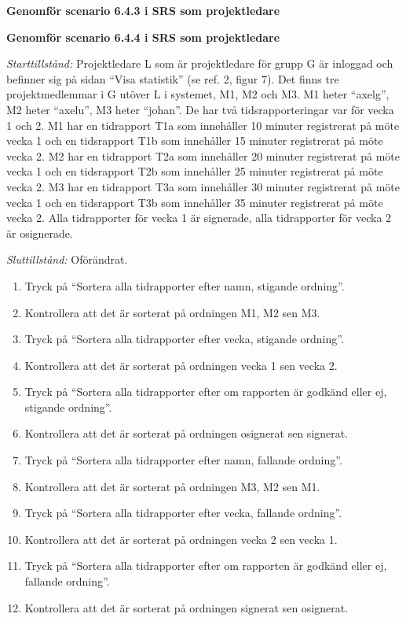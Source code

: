 \documentclass[a4paper]{article}
\begin{document}
\begin{ST}
\begin{enumerate}
\end{enumerate}

\item
\textbf{Genomför scenario 6.4.3 i SRS som projektledare}

\item
\textbf{Genomför scenario 6.4.4 i SRS som projektledare}

\emph{Starttillstånd:} Projektledare L som är projektledare för grupp G är inloggad och befinner sig på sidan ``Visa statistik'' (se ref. 2, figur 7). Det finns tre projektmedlemmar i G utöver L i systemet, M1, M2 och M3. M1 heter ``axelg'', M2 heter ``axelu'', M3 heter ``johan''. De har två tidsrapporteringar var för vecka 1 och 2. M1 har en tidrapport T1a som innehåller 10 minuter registrerat på möte vecka 1 och en tidsrapport T1b som innehåller 15 minuter registrerat på möte vecka 2. M2 har en tidrapport T2a som innehåller 20 minuter registrerat på möte vecka 1 och en tidsrapport T2b som innehåller 25 minuter registrerat på möte vecka 2. M3 har en tidrapport T3a som innehåller 30 minuter registrerat på möte vecka 1 och en tidsrapport T3b som innehåller 35 minuter registrerat på möte vecka 2. Alla tidrapporter för vecka 1 är signerade, alla tidrapporter för vecka 2 är osignerade.

\emph{Sluttillstånd:} Oförändrat.

\begin{enumerate}
\item Tryck på ``Sortera alla tidrapporter efter namn, stigande ordning''.
\item Kontrollera att det är sorterat på ordningen M1, M2 sen M3.
\item Tryck på ``Sortera alla tidrapporter efter vecka, stigande ordning''.
\item Kontrollera att det är sorterat på ordningen vecka 1 sen vecka 2.
\item Tryck på ``Sortera alla tidrapporter efter om rapporten är godkänd eller ej, stigande ordning''.
\item Kontrollera att det är sorterat på ordningen osignerat sen signerat.
\item Tryck på ``Sortera alla tidrapporter efter namn, fallande ordning''.
\item Kontrollera att det är sorterat på ordningen M3, M2 sen M1.
\item Tryck på ``Sortera alla tidrapporter efter vecka, fallande ordning''.
\item Kontrollera att det är sorterat på ordningen vecka 2 sen vecka 1.
\item Tryck på ``Sortera alla tidrapporter efter om rapporten är godkänd eller ej, fallande ordning''.
\item Kontrollera att det är sorterat på ordningen signerat sen osignerat.
\end{enumerate}

\end{ST}
\end{document}
